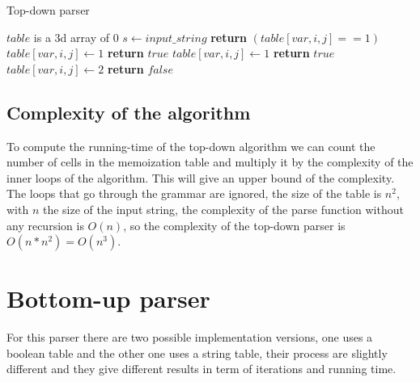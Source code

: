 \FloatBarrier
\begin{algorithm}
    \caption{Top-down parser}
    \label{parse}
    \begin{algorithmic}[1]
        \State $table$ is a 3d array of 0
        \State $s \gets input\_string$
         
                \State \textbf{return} $(table[var, i, j] == 1)$
            \EndIf
                        \State $table[var, i, j] \gets 1$
                        \State \textbf{return} $true$
                    \EndIf
                \EndFor
            \Else
                            \State $table[var, i, j] \gets 1$
                            \State \textbf{return} $true$ 
                        \EndIf
                    \EndFor
                \EndFor
            \EndIf
            \State $table[var, i, j] \gets 2$
            \State \textbf{return} $false$
        \EndProcedure
    \end{algorithmic}
\end{algorithm}
\FloatBarrier

\subsection{Complexity of the algorithm}

To compute the running-time of the top-down algorithm we can count the number of cells in the memoization table and multiply it by the complexity of the inner loops of the algorithm.
This will give an upper bound of the complexity.
The loops that go through the grammar are ignored, the size of the table is $n^2$, with $n$ the size of the input string, the complexity of the parse function without any recursion is $O(n)$, so the complexity of the top-down parser is $O(n * n^2) = O(n^3)$.

\section{Bottom-up parser}

For this parser there are two possible implementation versions, one uses a boolean table and the other one uses a string table, their process are slightly different and they give different results in term of iterations and running time.

